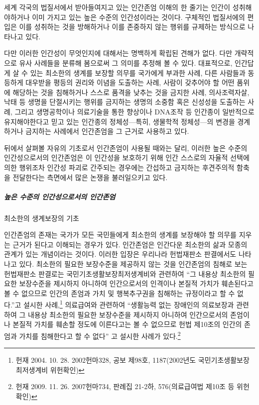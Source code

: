 세계 각국의 법질서에서 받아들여지고 있는 인간존엄 이해의 한 줄기는 인간이 성취해야하거나 이미 가지고 있는 높은 수준의 인간성이라는 것이다. 구체적인 법질서에의 편입은 이를 성취하는 것을 방해하거나 이를 존중하지 않는 행위를 규제하는 방식으로 나타나고 있다.

다만 이러한 인간성이 무엇인지에 대해서는 명백하게 확립된 견해가 없다. 다만 개략적으로 유사 사례들을 분류해 봄으로써 그 의미를 추정해 볼 수 있다. 대표적으로, 인간답게 살 수 있는 최소한의 생계를 보장할 의무를 국가에게 부과한 사례, 다른 사람들과 동등하게 대우받을 평등의 권리와 이념을 도출하는 사례, 사람이 갖추어야 할 어떤 품위에 해당하는 것을 침해하거나 스스로 품격을 낮추는 것을 금지한 사례, 의사조력자살, 낙태 등 생명을 단절시키는 행위를 금지하는 생명의 소중함 혹은 신성성을 도출하는 사례, 그리고 생명공학이나 의료기술을 통한 향상이나 DNA조작 등 인간종이 일반적으로 유지해야한다고 믿고 있는 인간종의 정체성---특히, 생물학적 정체성---의 변경을 경계하거나 금지하는 사례에서 인간존엄을 그 근거로 사용하고 있다.

뒤에서 살펴볼 자유의 기초로서 인간존엄이 사용될 때와는 달리, 이러한 높은 수준의 인간성으로서의 인간존엄은 이 인간성을 보호하기 위해 인간 스스로의 자율적 선택에 의한 행위조차 인간성 파괴로 간주되는 경우에는 간섭하고 금지하는 후견주의적 함축을 전달한다는 측면에서 많은 논쟁을 불러일으키고 있다.

\subparagraph{높은 수준의 인간성으로서의 인간존엄}

최소한의 생계보장의 기초

인간존엄의 존재는 국가가 모든 국민들에게 최소한의 생계를 보장해야 할 의무를 지우는 근거가 된다고 이해되는 경우가 있다. 인간존엄은 인간다운 최소한의 삶과 모종의 관계가 있는 개념이라는 것이다. 이러한 입장은 우리나라 헌법재판소 판결에서도 나타나고 있다. 최소한의 필요한 보장수준을 제공하지 않는 것을 인간존엄의 침해로 보는 헌법재판소 판결로는 국민기초생활보장최저생계비와 관련하여 ``그 내용상 최소한의 필요한 보장수준을 제시하지 아니하여 인간으로서의 인격이나 본질적 가치가 훼손된다고 볼 수 없으므로 인간의 존엄과 가치 및 행복추구권을 침해하는 규정이라고 할 수 없다.''고 설시한 사례,\footnote{헌재 2004. 10. 28. 2002헌마328, 공보 제98호, 1187(2002년도 국민기초생활보장최저생계비 위헌확인)} 의료급여와 관련하여 ``생활능력 없는 장애인의 의료보장과 관련하여 그 내용상 최소한의 필요한 보장수준을 제시하지 아니하여 인간으로서의 존엄이나 본질적 가치를 훼손할 정도에 이른다고는 볼 수 없으므로 헌법 제10조의 인간의 존엄과 가치를 침해한다고 할 수 없다'' 고 설시한 사례가 있다.\footnote{헌재 2009. 11. 26. 2007헌마734, 판례집 21-2하, 576(의료급여법 제10조 등 위헌확인)}

